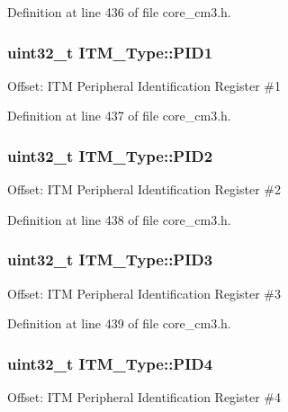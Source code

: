 Definition at line 436 of file core\+\_\+cm3.\+h.

\subsubsection[{\texorpdfstring{P\+I\+D1}{PID1}}]{ {\bf uint32\+\_\+t} I\+T\+M\+\_\+\+Type\+::\+P\+I\+D1}\hypertarget{struct_i_t_m___type_a30e87ec6f93ecc9fe4f135ca8b068990}{}\label{struct_i_t_m___type_a30e87ec6f93ecc9fe4f135ca8b068990}
Offset\+: I\+TM Peripheral Identification Register \#1 

Definition at line 437 of file core\+\_\+cm3.\+h.

\subsubsection[{\texorpdfstring{P\+I\+D2}{PID2}}]{ {\bf uint32\+\_\+t} I\+T\+M\+\_\+\+Type\+::\+P\+I\+D2}\hypertarget{struct_i_t_m___type_ae139d2e588bb382573ffcce3625a88cd}{}\label{struct_i_t_m___type_ae139d2e588bb382573ffcce3625a88cd}
Offset\+: I\+TM Peripheral Identification Register \#2 

Definition at line 438 of file core\+\_\+cm3.\+h.

\subsubsection[{\texorpdfstring{P\+I\+D3}{PID3}}]{ {\bf uint32\+\_\+t} I\+T\+M\+\_\+\+Type\+::\+P\+I\+D3}\hypertarget{struct_i_t_m___type_af006ee26c7e61c9a3712a80ac74a6cf3}{}\label{struct_i_t_m___type_af006ee26c7e61c9a3712a80ac74a6cf3}
Offset\+: I\+TM Peripheral Identification Register \#3 

Definition at line 439 of file core\+\_\+cm3.\+h.

\subsubsection[{\texorpdfstring{P\+I\+D4}{PID4}}]{ {\bf uint32\+\_\+t} I\+T\+M\+\_\+\+Type\+::\+P\+I\+D4}\hypertarget{struct_i_t_m___type_accfc7de00b0eaba0301e8f4553f70512}{}\label{struct_i_t_m___type_accfc7de00b0eaba0301e8f4553f70512}
Offset\+: I\+TM Peripheral Identification Register \#4 

